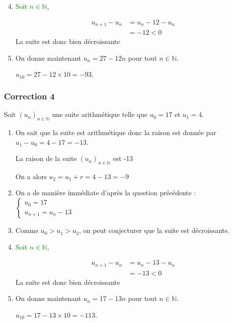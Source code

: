 \documentclass[15pt, mathserif]{beamer}
\newcommand{\N}{\mathbb{N}}			%
\newcommand{\st}[1]{$(#1_n)_{n \in \N}$}
\begin{document}
 \begin{frame}  
 \begin{enumerate} \setcounter{enumi}{3} 
 	 \item \textcolor{green}{Soit $n \in \N$}, 
 
  \begin{align*} 
 u_{n+1}-u_n &= u_n -12-u_n \\ 
 &= -12<0 
 \end{align*}La suite est donc bien décroissante
 \vfil 
 	 \item On donne maintenant $u_n=27-12n$ pour tout $n \in \N$. 
 
  \hfil$u_{10}=27-12\times 10=-93$. 
 
 \end{enumerate} \end{frame}


\begin{frame}
\vspace{-10mm}
	\frametitle{Correction 4}
Soit \st{u} une suite arithmétique telle que $u_0=17$ et $u_1=4$. 
 
 \begin{enumerate} 
 	 \item On sait que la suite est arithmétique donc la raison est donnée par $u_1-u_0= 4-17=-13$. 
 
 La raison de la suite \st{u} est -13
 
 On a alors $u_2=u_1+r=4-13=-9$ 
 \vfil 
 	 \item On a de manière immédiate d'après la question précédente : 
 \hfil$\begin{cases} 
 u_0=17 \\ 
 u_{n+1}=u_n-13 
 \end{cases}$ 
 \vfil 
 	 \item Comme $u_0>u_1>u_2$, on peut conjecturer que la suite est décroissante.
 \end{enumerate} 
 
 \end{frame} 
 
 \begin{frame}  
 \begin{enumerate} \setcounter{enumi}{3} 
 	 \item \textcolor{green}{Soit $n \in \N$}, 
 
  \begin{align*} 
 u_{n+1}-u_n &= u_n -13-u_n \\ 
 &= -13<0 
 \end{align*}La suite est donc bien décroissante
 \vfil 
 	 \item On donne maintenant $u_n=17-13n$ pour tout $n \in \N$. 
 
  \hfil$u_{10}=17-13\times 10=-113$. 
 
 \end{enumerate} \end{frame}
\end{document}
